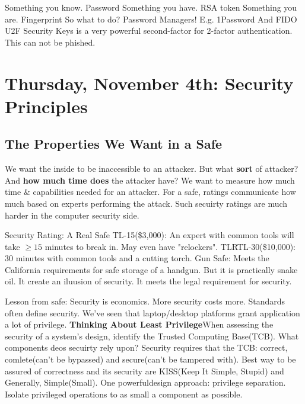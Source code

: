 \documentclass[11 pt]{scrartcl}
\begin{document}
Something you know. Password\newline
Something you have. RSA token\newline
Something you are. Fingerprint\newline
So what to do? Password Managers! E.g. 1Password\newline
And FIDO U2F Security Keys is a very powerful second-factor for 2-factor authentication. This can not be phished.
\newpage
\section{Thursday, November 4th: Security Principles}
\subsection{The Properties We Want in a Safe}
We want the inside to be inaccessible to an attacker. But what \textbf{sort} of attacker? And \textbf{how much time does} the attacker have? We want to measure how much time \& capabilities needed for an attacker. For a safe, ratings communicate how much based on experts performing the attack. Such secuirty ratings are much harder in the computer security side.
\begin{example}
    Security Rating: A Real Safe\newline
    TL-15(\$3,000): An expert with common tools will take $\ge 15$ minutes to break in. May even have "relockers".\newline
    TLRTL-30(\$10,000): 30 minutes with common tools and a cutting torch.\newline
    Gun Safe: Meets the California requirements for safe storage of a handgun. But it is practically snake oil. It create an iluusion of security. It meets the legal requirement for security.
\end{example}
Lesson from safe: Security is economics. More security costs more. Standards often define security.\newline
We've seen that laptop/desktop platforms grant application a lot of privilege. \newline
\textbf{Thinking About Least Privilege}\newline When assessing the security of a system's design, identify the Trusted Computing Base(TCB). What components deos secuirty rely upon? Security requires that the TCB: correct, comlete(can't be bypassed) and secure(can't be tampered with). Best way to be assured of correctness and its security are KISS(Keep It Simple, Stupid) and Generally, Simple(Small). One powerfuldesign approach: privilege separation. Isolate privileged operations to as small a component as possible.
\end{document}
